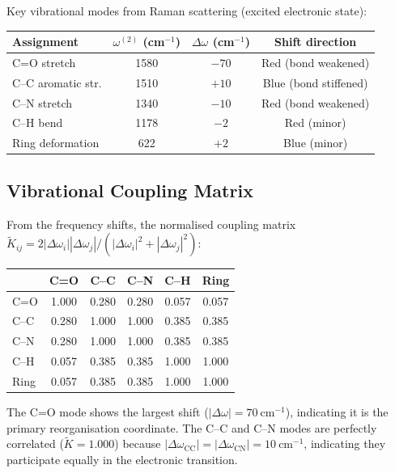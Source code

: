 \documentclass[11pt,twocolumn,a4paper]{article}
\theoremstyle{definition}
\theoremstyle{remark}
\begin{document}
Key vibrational modes from Raman scattering (excited electronic state):
\begin{center}
\begin{tabular}{lccc}
\toprule
Assignment & $\omega^{(2)}$ (cm$^{-1}$) & $\Delta\omega$ (cm$^{-1}$) & Shift direction \\
\midrule
C=O stretch       & 1580 & $-70$ & Red (bond weakened) \\
C--C aromatic str. & 1510 & $+10$ & Blue (bond stiffened) \\
C--N stretch       & 1340 & $-10$ & Red (bond weakened) \\
C--H bend          & 1178 & $-2$  & Red (minor) \\
Ring deformation   & 622  & $+2$  & Blue (minor) \\
\bottomrule
\end{tabular}
\end{center}


\subsection{Vibrational Coupling Matrix}

From the frequency shifts, the normalised coupling matrix $\tilde{K}_{ij} = 2|\Delta\omega_i||\Delta\omega_j|/(|\Delta\omega_i|^2 + |\Delta\omega_j|^2)$:

\begin{center}
\begin{tabular}{lccccc}
\toprule
 & C=O & C--C & C--N & C--H & Ring \\
\midrule
C=O  & 1.000 & 0.280 & 0.280 & 0.057 & 0.057 \\
C--C & 0.280 & 1.000 & 1.000 & 0.385 & 0.385 \\
C--N & 0.280 & 1.000 & 1.000 & 0.385 & 0.385 \\
C--H & 0.057 & 0.385 & 0.385 & 1.000 & 1.000 \\
Ring & 0.057 & 0.385 & 0.385 & 1.000 & 1.000 \\
\bottomrule
\end{tabular}
\end{center}

The C=O mode shows the largest shift ($|\Delta\omega| = 70~\mathrm{cm}^{-1}$), indicating it is the primary reorganisation coordinate. The C--C and C--N modes are perfectly correlated ($\tilde{K} = 1.000$) because $|\Delta\omega_{\mathrm{CC}}| = |\Delta\omega_{\mathrm{CN}}| = 10~\mathrm{cm}^{-1}$, indicating they participate equally in the electronic transition.
\end{document}
